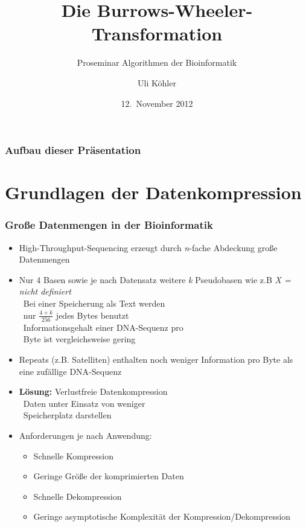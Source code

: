 \documentclass[14pt,xcolor=dvipsnames,pdftex]{beamer}
\title{Die Burrows-Wheeler-Transformation}
\subtitle{Proseminar \glqq Algorithmen der Bioinformatik\grqq}
\author{Uli Köhler}
\date{12.~November 2012}
\begin{document}
\frame{\titlepage}
\begin{frame}
\frametitle{Aufbau dieser Präsentation}
\tableofcontents
\end{frame}

\section{Grundlagen der Datenkompression}
\begin{frame}[allowframebreaks]
\frametitle{Große Datenmengen in der Bioinformatik}
  \begin{itemize}
   \item High-Throughput-Sequencing erzeugt durch \textit{n}-fache Abdeckung große Datenmengen
   \item Nur 4 Basen  sowie je nach Datensatz weitere \textit{k} Pseudobasen wie z.B \textit{X = nicht definiert}\\
   \textrightarrow\ Bei einer Speicherung als Text werden\\\quad\ nur $\frac{4+k}{256}$ jedes Bytes benutzt\\
   \textrightarrow\ Informationsgehalt einer DNA-Sequenz pro\\\quad\ Byte ist vergleichsweise gering
  \end{itemize}
\framebreak
\begin{itemize}
 \item Repeats (z.B. Satelliten) enthalten noch weniger Information pro Byte als eine zufällige DNA-Sequenz
\end{itemize}
\framebreak
\begin{itemize}
 \item \textbf{Lösung:} Verlustfreie Datenkompression\\
 \textrightarrow\ Daten unter Einsatz von weniger\\
 \quad\ Speicherplatz darstellen
 \item Anforderungen je nach Anwendung:
 \begin{itemize}
  \item Schnelle Kompression
  \item Geringe Größe der komprimierten Daten
  \item Schnelle Dekompression
  \item Geringe asymptotische Komplexität der Kompression/Dekompression
 \end{itemize}
\end{itemize}
\end{frame}
\end{document}
